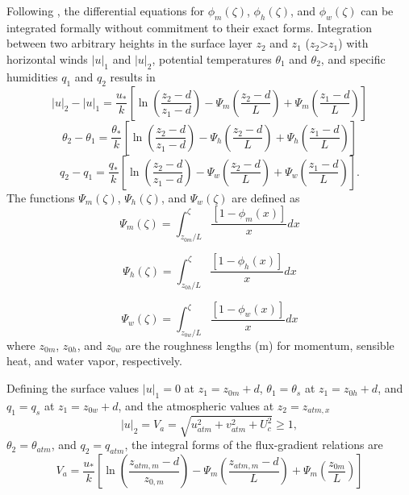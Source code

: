 \documentclass[12pt,authoryear]{elsarticle}
\numberwithin{equation}{section} %
\begin{document}
Following \cite{panofskyAtmosphericTurbulenceModels1984}, the differential equations for $\phi_{m}(\zeta)$, $\phi_{h}(\zeta)$, and $\phi_{w}(\zeta)$ can be integrated formally without commitment to their exact forms. Integration between two arbitrary heights in the surface layer $z_{2}$ and $z_{1}$ ($z_{2}$>$z_{1}$) with horizontal winds $|u|_{1}$ and $|u|_{2}$, potential temperatures $\theta_{1}$ and $\theta_{2}$, and specific humidities $q_{1}$ and $q_{2}$ results in 
\begin{equation}
|u|_{2}-|u|_{1} = \frac{u_*}{k}\left[\ln\left(\frac{z_{2}-d}{z_{1}-d}\right)-\Psi_{m}\left(\frac{z_2-d}{L}\right)+\Psi_{m}\left(\frac{z_1-d}{L}\right)\right]
\end{equation}
\begin{equation}
\theta_{2}-\theta_{1} = \frac{\theta_*}{k}\left[\ln\left(\frac{z_{2}-d}{z_{1}-d}\right)-\Psi_{h}\left(\frac{z_2-d}{L}\right)+\Psi_{h}\left(\frac{z_1-d}{L}\right)\right]
\end{equation}
\begin{equation}
q_{2}-q_{1} = \frac{q_*}{k}\left[\ln\left(\frac{z_{2}-d}{z_{1}-d}\right)-\Psi_{w}\left(\frac{z_2-d}{L}\right)+\Psi_{w}\left(\frac{z_1-d}{L}\right)\right].
\end{equation}
The functions $\Psi_{m}(\zeta)$, $\Psi_{h}(\zeta)$, and $\Psi_{w}(\zeta)$ are defined as
\begin{equation}
\Psi_{m}(\zeta)=\int_{z_{0m}/L}^{\zeta}\frac{[1-\phi_{m}(x)]}{x}dx
\end{equation}

\begin{equation}
\Psi_{h}(\zeta)=\int_{z_{0h}/L}^{\zeta}\frac{[1-\phi_{h}(x)]}{x}dx
\end{equation}

\begin{equation}
\Psi_{w}(\zeta)=\int_{z_{0w}/L}^{\zeta}\frac{[1-\phi_{w}(x)]}{x}dx
\end{equation}
where $z_{0m}$, $z_{0h}$, and $z_{0w}$ are the roughness lengths (m) for momentum, sensible heat, and water vapor, respectively.

Defining the surface values $|u|_1=0$ at $z_{1}=z_{0m}+d$, $\theta_1=\theta_s$ at $z_1=z_{0h}+d$, and $q_{1}=q_{s}$ at $z_{1}=z_{0w}+d$, and the atmospheric values at $z_2=z_{atm,x}$
\begin{equation}
\label{eq:atmospheric_wind_speed}
|u|_{2}=V_{a}=\sqrt{u_{atm}^2+v_{atm}^2+U_{c}^2}\geq1,
\end{equation}
$\theta_2=\theta_{atm}$, and $q_2=q_{atm}$, the integral forms of the flux-gradient relations are 
\begin{equation}
V_{a}=\frac{u_*}{k}\left[\ln\left(\frac{z_{atm,m}-d}{z_{0,m}}\right)-\Psi_{m}\left(\frac{z_{atm,m}-d}{L}\right)+\Psi_{m}\left(\frac{z_{0m}}{L}\right)\right]
\end{equation}
\end{document}
